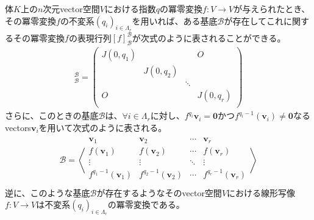 \documentclass[dvipdfmx]{jsarticle}
\begin{document}
\begin{thm}\label{2.2.5.9}
体$K$上の$n$次元vector空間$V$における指数$q$の冪零変換$f:V \rightarrow V$が与えられたとき、その冪零変換$f$の不変系$\left( q_{i} \right)_{i \in \varLambda_{r}}$を用いれば、ある基底$\mathcal{B}$が存在してこれに関するその冪零変換$f$の表現行列$[ f]_{\mathcal{B}}^{\mathcal{B}}$が次式のように表されることができる。
\begin{align*}
[ f]_{\mathcal{B}}^{\mathcal{B}} = \begin{pmatrix}
J\left( 0,q_{1} \right) & \  & \  & O \\
\  & J\left( 0,q_{2} \right) & \  & \  \\
\  & \  & \ddots & \  \\
O & \  & \  & J\left( 0,q_{r} \right) \\
\end{pmatrix}
\end{align*}
さらに、このときの基底$\mathcal{B}$は、$\forall i \in \varLambda_{r}$に対し、$f^{q_{i}}\mathbf{v}_{i} = \mathbf{0}$かつ$f^{q_{i} - 1}\left( \mathbf{v}_{i} \right) \neq \mathbf{0}$なるvectors$\mathbf{v}_{i}$を用いて次式のように表される。
\begin{align*}
\mathcal{B} =\left\langle \begin{matrix}
\mathbf{v}_{1} & \mathbf{v}_{2} & \cdots & \mathbf{v}_{r} \\
f\left( \mathbf{v}_{1} \right) & f\left( \mathbf{v}_{2} \right) & \cdots & f\left( \mathbf{v}_{r} \right) \\
 \vdots & \vdots & \ddots & \vdots \\
f^{q_{1} - 1}\left( \mathbf{v}_{1} \right) & f^{q_{2} - 1}\left( \mathbf{v}_{2} \right) & \cdots & f^{q_{r} - 1}\left( \mathbf{v}_{r} \right) \\
\end{matrix} \right\rangle
\end{align*}
逆に、このような基底$\mathcal{B}$が存在するようなそのvector空間$V$における線形写像$f:V \rightarrow V$は不変系$\left( q_{i} \right)_{i \in \varLambda_{r}}$の冪零変換である。
\end{thm}
\end{document}
